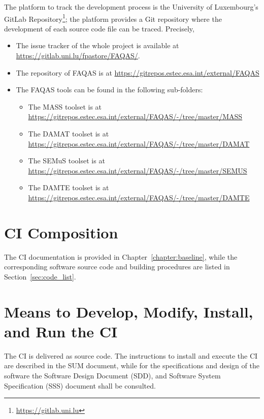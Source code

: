 The platform to track the development process is the University of Luxembourg's GitLab Repository\footnote{\url{https://gitlab.uni.lu}}; the platform provides a Git repository where the development of each source code file can be traced. Precisely,
\STARTCHANGEDFINAL
\begin{itemize}
\item The issue tracker of the whole project is available at \url{https://gitlab.uni.lu/fpastore/FAQAS/}.
\item The repository of FAQAS is at \url{https://gitrepos.estec.esa.int/external/FAQAS}
\item The FAQAS tools can be found in the following sub-folders:
\begin{itemize}
    \item The MASS toolset is at \url{https://gitrepos.estec.esa.int/external/FAQAS/-/tree/master/MASS}
    \item The DAMAT toolset is at \url{https://gitrepos.estec.esa.int/external/FAQAS/-/tree/master/DAMAT}
    \item The SEMuS toolset is at \url{https://gitrepos.estec.esa.int/external/FAQAS/-/tree/master/SEMUS}
    \item The DAMTE toolset is at \url{https://gitrepos.estec.esa.int/external/FAQAS/-/tree/master/DAMTE}
\end{itemize}
\end{itemize}
\ENDCHANGEDFINAL

\section{CI Composition}

The CI documentation is provided in Chapter~\ref{chapter:baseline}, while the corresponding software source code and building procedures are listed in Section~\ref{sec:code_list}.

\section{Means to Develop, Modify, Install, and Run the CI}

The CI is delivered as source code. The instructions to install and execute the CI are described in the SUM document, while for the specifications and design of the software the Software Design Document (SDD), and Software System Specification (SSS) document shall be consulted.

